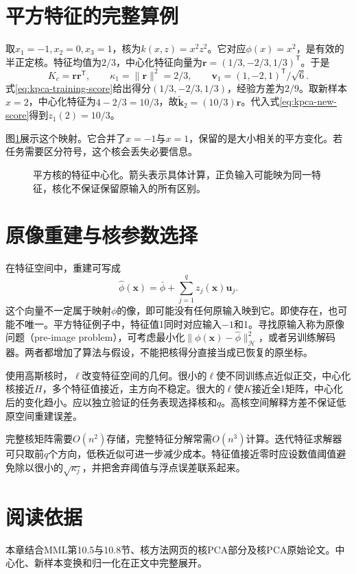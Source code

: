 \section{平方特征的完整算例}
取$x_1=-1,x_2=0,x_3=1$，核为$k(x,z)=x^2z^2$。它对应$\phi(x)=x^2$，是有效的半正定核。特征均值为$2/3$，中心化特征向量为$\bm r=(1/3,-2/3,1/3)^{\mathsf T}$。于是
\begin{equation}
 K_c=\bm r\bm r^{\mathsf T},\qquad
 \kappa_1=\|\bm r\|^2=2/3,\qquad
 \bm v_1=(1,-2,1)^{\mathsf T}/\sqrt6.
\end{equation}
式\eqref{eq:kpca-training-score}给出得分$(1/3,-2/3,1/3)$，经验方差为$2/9$。取新样本$x=2$，中心化特征为$4-2/3=10/3$，故$\tilde{\bm k}_{2}=(10/3)\bm r$。代入式\eqref{eq:kpca-new-score}得到$z_1(2)=10/3$。

图\ref{fig:kpca-square-map}展示这个映射。它合并了$x=-1$与$x=1$，保留的是大小相关的平方变化。若任务需要区分符号，这个核会丢失必要信息。
\begin{figure}[htbp]
\centering
{}
\caption{平方核的特征中心化。箭头表示具体计算，正负输入可能映为同一特征，核化不保证保留原输入的所有区别。}
\label{fig:kpca-square-map}
\end{figure}

\section{原像重建与核参数选择}
在特征空间中，重建可写成
\begin{equation}
 \hat\phi(\bm x)=\bar\phi+\sum_{j=1}^qz_j(\bm x)\bm u_j.
\end{equation}
这个向量不一定属于映射$\phi$的像，即可能没有任何原输入映到它。即使存在，也可能不唯一。平方特征例子中，特征值1同时对应输入$-1$和1。寻找原输入称为原像问题（pre-image problem），可考虑最小化$\|\phi(\bm x)-\hat\phi\|_{\mathcal H}^2$，或者另训练解码器。两者都增加了算法与假设，不能把核得分直接当成已恢复的原坐标。

使用高斯核时，$\ell$改变特征空间的几何。很小的$\ell$使不同训练点近似正交，中心化核接近$H$，多个特征值接近，主方向不稳定。很大的$\ell$使$K$接近全1矩阵，中心化后的变化趋小。应以独立验证的任务表现选择核和$q$。高核空间解释方差不保证低原空间重建误差。

完整核矩阵需要$O(n^2)$存储，完整特征分解常需$O(n^3)$计算。迭代特征求解器可只取前$q$个方向，低秩近似可进一步减少成本。特征值接近零时应设数值阈值避免除以很小的$\sqrt{\kappa_j}$，并把舍弃阈值与浮点误差联系起来。

\section{阅读依据}
本章结合MML第10.5与10.8节、核方法网页的核PCA部分及核PCA原始论文\cite{scholkopf1998kpca}。中心化、新样本变换和归一化在正文中完整展开。
